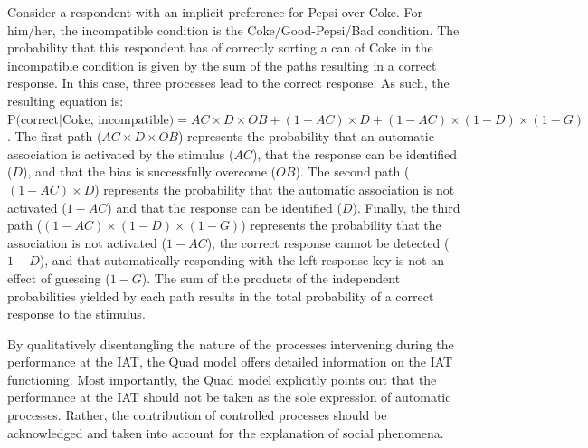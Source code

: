 \documentclass[12pt]{book}
\begin{document}
Consider a respondent with an implicit preference for Pepsi over Coke. For him/her, the incompatible condition is the Coke/Good-Pepsi/Bad condition. The probability that this respondent has of correctly sorting a can of Coke in the incompatible condition is given by the sum of the paths resulting in a correct response. In this case, three processes lead to the correct response. As such, the resulting equation is: $\text{P(correct}|\text{Coke, incompatible)} = AC \times D \times OB + (1-AC)\times D + (1-AC)\times (1-D) \times (1-G)$. 
The first path ($AC \times D \times OB$) represents the probability that an automatic association is activated by the stimulus ($AC$), that the response can be identified ($D$), and that the bias is successfully overcome ($OB$).
The second path  ($(1-AC)\times D$) represents the probability that the automatic association is not activated ($1 - AC$) and that the response can be identified ($D$). 
Finally, the third path ($(1-AC)\times (1-D) \times (1-G)$) represents the probability that the association is not activated ($1-AC$), the correct response cannot be detected ($1-D$), and that automatically responding with the left response key is not an effect of guessing ($1-G$).
The sum of the products of the independent probabilities yielded by each path results in the total probability of a correct response to the stimulus.


By qualitatively disentangling the nature of the processes intervening during the performance at the IAT, the Quad model offers detailed information on the IAT functioning. 
Most importantly, the Quad model explicitly points out that the performance at the IAT should not be taken as the sole expression of automatic processes. Rather, the contribution of controlled processes should be acknowledged and taken into account for the explanation of social phenomena. 
\end{document}

